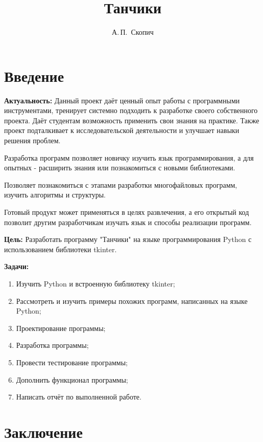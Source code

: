 \documentclass[14pt, oneside]{altsu-report}
\title{Танчики}
\author{А.\,П.~Скопич}
\institute{Институт цифровых технологий, электроники и физики}
\date{\the\year}
\begin{document}
\maketitle

\setcounter{page}{2}
\makeabstract
\tableofcontents

\chapter*{Введение}

\textbf{Актуальность: }
Данный проект даёт ценный опыт работы с программными инструментами, тренирует системно подходить к разработке своего собственного проекта. Даёт студентам возможность применить свои знания на практике. Также проект подталкивает к исследовательской деятельности и улучшает навыки решения проблем.

Разработка программ позволяет новичку изучить язык программирования, а для опытных - расширить знания или познакомиться с новыми библиотеками.

Позволяет познакомиться с этапами разработки многофайловых программ, изучить алгоритмы и структуры.

Готовый продукт может применяться в целях развлечения, а его открытый код позволит другим разработчикам изучать язык и способы реализации программ.

\textbf{Цель: }
Разработать программу "Танчики" на языке программирования Python с использованием библиотеки tkinter.

\textbf{Задачи:}
\begin{enumerate}
\item Изучить Python и встроенную библиотеку tkinter;
\item Рассмотреть и изучить примеры похожих программ, написанных на языке Python;
\item Проектирование программы;
\item Разработка программы;
\item Провести тестирование программы;
\item Дополнить функционал программы;
\item Написать отчёт по выполненной работе.
\end{enumerate}




\chapter*{Заключение}
\end{document}
